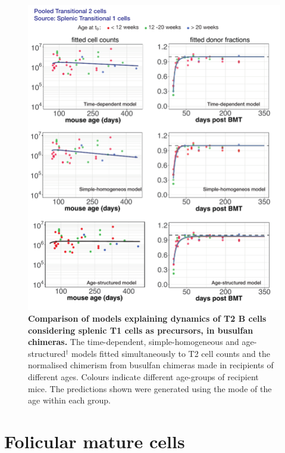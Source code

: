 \documentclass[11pt]{article}
\begin{document}
\begin{figure}[h!]
	\centerline{\includegraphics[scale = 1.1] {T2_T1.pdf}}
	\caption{\small \textbf{Comparison of models  explaining dynamics of T2 B cells considering splenic T1 cells as precursors, in busulfan chimeras.} The time-dependent, simple-homogeneous and age-structured$^{\dagger}$ models fitted simultaneously to T2 cell counts and the normalised chimerism from busulfan chimeras made in recipients of different ages. Colours indicate different age-groups of recipient mice. The predictions shown were generated using the  mode of the age within each group.}
	\label{fig:T2_T1}
\end{figure}


\clearpage


\section*{Folicular mature cells}
\end{document}
